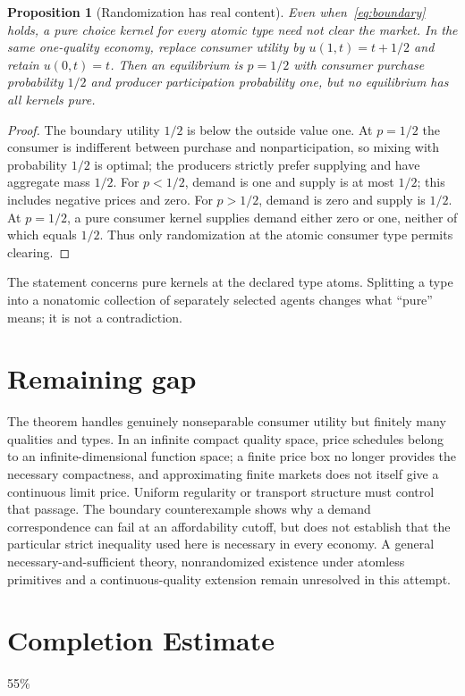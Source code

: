 \documentclass[11pt,a4paper]{article}
\newtheorem{proposition}[theorem]{Proposition}
\theoremstyle{definition}
\theoremstyle{remark}
\begin{document}
\begin{proposition}[Randomization has real content]
Even when~\eqref{eq:boundary} holds, a pure choice kernel for every atomic type need not clear the market. In the same one-quality economy, replace consumer utility by $u(1,t)=t+1/2$ and retain $u(0,t)=t$. Then an equilibrium is $p=1/2$ with consumer purchase probability $1/2$ and producer participation probability one, but no equilibrium has all kernels pure.
\end{proposition}
\begin{proof}
The boundary utility $1/2$ is below the outside value one. At $p=1/2$ the consumer is indifferent between purchase and nonparticipation, so mixing with probability $1/2$ is optimal; the producers strictly prefer supplying and have aggregate mass $1/2$. For $p<1/2$, demand is one and supply is at most $1/2$; this includes negative prices and zero. For $p>1/2$, demand is zero and supply is $1/2$. At $p=1/2$, a pure consumer kernel supplies demand either zero or one, neither of which equals $1/2$. Thus only randomization at the atomic consumer type permits clearing.
\end{proof}

The statement concerns pure kernels at the declared type atoms. Splitting a type into a nonatomic collection of separately selected agents changes what ``pure'' means; it is not a contradiction.

\section{Remaining gap}
The theorem handles genuinely nonseparable consumer utility but finitely many qualities and types. In an infinite compact quality space, price schedules belong to an infinite-dimensional function space; a finite price box no longer provides the necessary compactness, and approximating finite markets does not itself give a continuous limit price. Uniform regularity or transport structure must control that passage. The boundary counterexample shows why a demand correspondence can fail at an affordability cutoff, but does not establish that the particular strict inequality used here is necessary in every economy. A general necessary-and-sufficient theory, nonrandomized existence under atomless primitives and a continuous-quality extension remain unresolved in this attempt.

\section{Completion Estimate}
55\%
\end{document}
